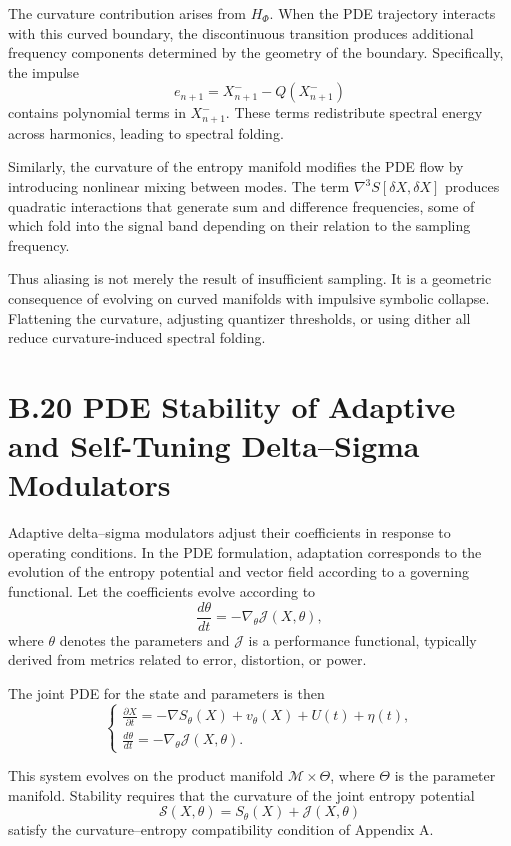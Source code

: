 The curvature contribution arises from \(H_{\Phi}\). When the PDE trajectory interacts with this curved boundary, the discontinuous transition produces additional frequency components determined by the geometry of the boundary. Specifically, the impulse
\[
e_{n+1} = X_{n+1}^{-} - Q(X_{n+1}^{-})
\]
contains polynomial terms in \(X_{n+1}^{-}\). These terms redistribute spectral energy across harmonics, leading to spectral folding.

Similarly, the curvature of the entropy manifold modifies the PDE flow by introducing nonlinear mixing between modes. The term \(\nabla^{3}S[\delta X, \delta X]\) produces quadratic interactions that generate sum and difference frequencies, some of which fold into the signal band depending on their relation to the sampling frequency.

Thus aliasing is not merely the result of insufficient sampling. It is a geometric consequence of evolving on curved manifolds with impulsive symbolic collapse. Flattening the curvature, adjusting quantizer thresholds, or using dither all reduce curvature-induced spectral folding.

\section{B.20 PDE Stability of Adaptive and Self-Tuning Delta–Sigma Modulators}

Adaptive delta–sigma modulators adjust their coefficients in response to operating conditions. In the PDE formulation, adaptation corresponds to the evolution of the entropy potential and vector field according to a governing functional. Let the coefficients evolve according to
\[
\frac{d\theta}{dt} = -\nabla_{\theta} \mathcal{J}(X,\theta),
\]
where \(\theta\) denotes the parameters and \(\mathcal{J}\) is a performance functional, typically derived from metrics related to error, distortion, or power.

The joint PDE for the state and parameters is then
\[
\begin{cases}
\displaystyle
\frac{\partial X}{\partial t}
= -\nabla S_{\theta}(X) + v_{\theta}(X) + U(t) + \eta(t),
\\[1em]
\displaystyle
\frac{d\theta}{dt}
= -\nabla_{\theta} \mathcal{J}(X,\theta).
\end{cases}
\]

This system evolves on the product manifold \(\mathcal{M} \times \Theta\), where \(\Theta\) is the parameter manifold. Stability requires that the curvature of the joint entropy potential
\[
\mathcal{S}(X,\theta) = S_{\theta}(X) + \mathcal{J}(X,\theta)
\]
satisfy the curvature–entropy compatibility condition of Appendix A.


